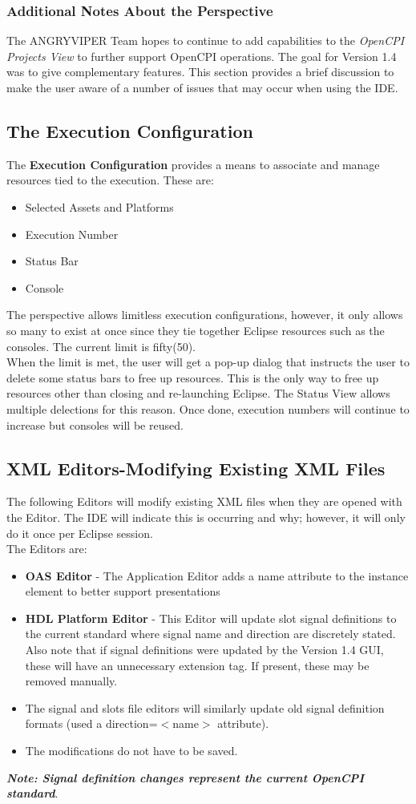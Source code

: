\documentclass[10pt, a4paper, oneside]{article}
\begin{document}
\subsubsection{Additional Notes About the Perspective}
The ANGRYVIPER Team hopes to continue to add capabilities to the \emph{OpenCPI Projects View} to further support OpenCPI operations. The goal for Version 1.4 was to give complementary features. This section provides a brief discussion to make the user aware of a number of issues that may occur when using the IDE.
\subsection{The Execution Configuration}
The \textbf{Execution Configuration} provides a means to associate and manage resources tied to the execution. These are:
\begin{itemize}
\item	Selected Assets and Platforms
\item	Execution Number
\item	Status Bar
\item	Console
\end{itemize}
The perspective allows limitless execution configurations,  however,  it only allows so many to exist at once since they tie together Eclipse resources such as the consoles. The current limit is fifty(50). \\

When the limit is met, the user will get a pop-up dialog that instructs the user to delete some status bars to free up resources. This is the only way to free up resources other than closing and re-launching Eclipse. The Status View allows multiple delections for this reason. Once done, execution numbers will continue to increase but consoles will be reused.

\subsection{XML Editors-Modifying Existing XML Files}
The following Editors will modify existing XML files when they are opened with the Editor. The IDE will indicate this is occurring and why; however, it will only do it once per Eclipse session.\\
The Editors are:
\begin{itemize}
\item	\textbf{OAS Editor} - The Application Editor adds a name attribute to the instance element to better support presentations
\item	\textbf{HDL Platform Editor} - This Editor will update slot signal definitions to the current standard where signal name and direction are discretely stated. Also note that if signal definitions were updated by the Version 1.4 GUI, these will have an unnecessary extension tag. If present, these may be removed manually.
\item	[]The signal and slots file editors will similarly update old signal definition formats (used a direction=$<$name$>$ attribute).
\item [] The modifications do not have to be saved.\
\end{itemize}
\textbf{\emph{Note: Signal definition changes represent the current OpenCPI standard}}.
\end{document}
